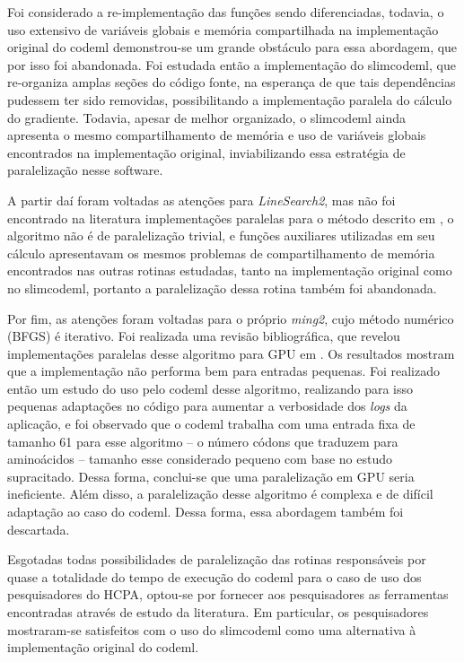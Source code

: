 \documentclass[cic,tc]{iiufrgs}
\begin{document}
Foi considerado a re-implementação das funções sendo diferenciadas, todavia, o
uso extensivo de variáveis globais e memória compartilhada na implementação
original do codeml demonstrou-se um grande obstáculo para essa abordagem, que
por isso foi abandonada. Foi estudada então a implementação do slimcodeml, que
re-organiza amplas seções do código fonte, na esperança de que tais
dependências pudessem ter sido removidas, possibilitando a implementação
paralela do cálculo do gradiente. Todavia, apesar de melhor organizado, o
slimcodeml ainda apresenta o mesmo compartilhamento de memória e uso de
variáveis globais encontrados na implementação original, inviabilizando essa
estratégia de paralelização nesse software.

A partir daí foram voltadas as atenções para \textit{LineSearch2}, mas não foi
encontrado na literatura implementações paralelas para o método descrito em
\cite{wolfe1978numerical}, o algoritmo não é de paralelização trivial, e
funções auxiliares utilizadas em seu cálculo apresentavam os mesmos problemas
de compartilhamento de memória encontrados nas outras rotinas estudadas, tanto
na implementação original como no slimcodeml, portanto a paralelização dessa
rotina também foi abandonada.

Por fim, as atenções foram voltadas para o próprio \textit{ming2}, cujo método
numérico (BFGS) é iterativo. Foi realizada uma revisão bibliográfica, que
revelou implementações paralelas desse algoritmo para GPU em
\cite{fei2014parallel}. Os resultados mostram que a implementação não
performa bem para entradas pequenas. Foi realizado então um estudo do uso pelo
codeml desse algoritmo, realizando para isso pequenas adaptações no código para
aumentar a verbosidade dos \textit{logs} da aplicação, e foi observado que o
codeml trabalha com uma entrada fixa de tamanho 61 para esse algoritmo -- o
número códons que traduzem para aminoácidos -- tamanho esse considerado pequeno
com base no estudo supracitado. Dessa forma, conclui-se que uma paralelização
em GPU seria ineficiente. Além disso, a paralelização desse algoritmo é
complexa e de difícil adaptação ao caso do codeml. Dessa forma, essa abordagem
também foi descartada.

Esgotadas todas possibilidades de paralelização das rotinas responsáveis por
quase a totalidade do tempo de execução do codeml para o caso de uso dos
pesquisadores do HCPA, optou-se por fornecer aos pesquisadores as ferramentas
encontradas através de estudo da literatura. Em particular, os pesquisadores
mostraram-se satisfeitos com o uso do slimcodeml como uma alternativa à
implementação original do codeml.
\end{document}
